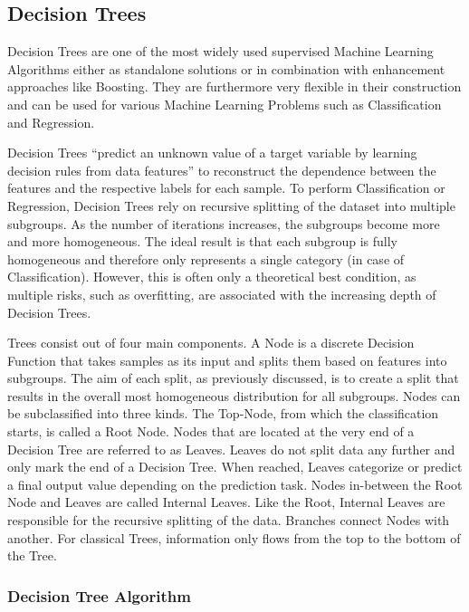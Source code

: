 \subsection{Decision Trees}

Decision Trees are one of the most widely used supervised Machine Learning Algorithms either 
as standalone solutions or in combination with enhancement approaches like Boosting. They are 
furthermore very flexible in their construction and can be used for various Machine Learning 
Problems such as Classification and Regression. 

Decision Trees “predict an unknown value of a target variable by learning decision rules from 
data features” to reconstruct the dependence between the features and the respective labels for 
each sample. To perform Classification or Regression, Decision Trees rely on recursive 
splitting of the dataset into multiple subgroups. As the number of iterations increases, the 
subgroups become more and more homogeneous. The ideal result is that each subgroup is fully 
homogeneous and therefore only represents a single category (in case of Classification). However, 
this is often only a theoretical best condition, as multiple risks, such as overfitting, are 
associated with the increasing depth of Decision Trees.

Trees consist out of four main components. A Node is a discrete Decision Function that takes 
samples as its input and splits them based on features into subgroups. The aim of each split, 
as previously discussed, is to create a split that results in the overall most homogeneous 
distribution for all subgroups. Nodes can be subclassified into three kinds. The Top-Node, 
from which the classification starts, is called a Root Node. Nodes that are located at the 
very end of a Decision Tree are referred to as Leaves. Leaves do not split data any further and 
only mark the end of a Decision Tree. When reached, Leaves categorize or predict a final output 
value depending on the prediction task. Nodes in-between the Root Node and Leaves are called 
Internal Leaves. Like the Root, Internal Leaves are responsible for the recursive splitting of 
the data. Branches connect Nodes with another. For classical Trees, information only flows from 
the top to the bottom of the Tree. 

\subsubsection{Decision Tree Algorithm}

